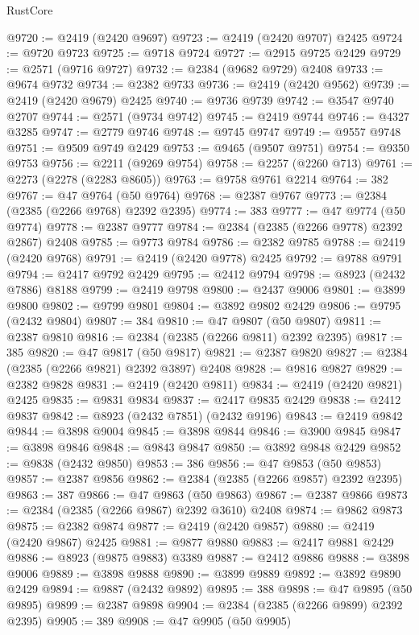 \begin{lexlean}{RustCore}
\begin{coremodule}
@9720 := @2419 (@2420 @9697)
@9723 := @2419 (@2420 @9707) @2425
@9724 := @9720 @9723
@9725 := @9718 @9724
@9727 := @2915 @9725 @2429
@9729 := @2571 (@9716 @9727)
@9732 := @2384 (@9682 @9729) @2408
@9733 := @9674 @9732
@9734 := @2382 @9733
@9736 := @2419 (@2420 @9562)
@9739 := @2419 (@2420 @9679) @2425
@9740 := @9736 @9739
@9742 := @3547 @9740 @2707
@9744 := @2571 (@9734 @9742)
@9745 := @2419 @9744
@9746 := @4327 @3285
@9747 := @2779 @9746
@9748 := @9745 @9747
@9749 := @9557 @9748
@9751 := @9509 @9749 @2429
@9753 := @9465 (@9507 @9751)
@9754 := @9350 @9753
@9756 := @2211 (@9269 @9754)
@9758 := @2257 (@2260 @713)
@9761 := @2273 (@2278 (@2283 @8605))
@9763 := @9758 @9761 @2214
@9764 := 382
@9767 := @47 @9764 (@50 @9764)
@9768 := @2387 @9767
@9773 := @2384 (@2385 (@2266 @9768) @2392 @2395)
@9774 := 383
@9777 := @47 @9774 (@50 @9774)
@9778 := @2387 @9777
@9784 := @2384 (@2385 (@2266 @9778) @2392 @2867) @2408
@9785 := @9773 @9784
@9786 := @2382 @9785
@9788 := @2419 (@2420 @9768)
@9791 := @2419 (@2420 @9778) @2425
@9792 := @9788 @9791
@9794 := @2417 @9792 @2429
@9795 := @2412 @9794
@9798 := @8923 (@2432 @7886) @8188
@9799 := @2419 @9798
@9800 := @2437 @9006
@9801 := @3899 @9800
@9802 := @9799 @9801
@9804 := @3892 @9802 @2429
@9806 := @9795 (@2432 @9804)
@9807 := 384
@9810 := @47 @9807 (@50 @9807)
@9811 := @2387 @9810
@9816 := @2384 (@2385 (@2266 @9811) @2392 @2395)
@9817 := 385
@9820 := @47 @9817 (@50 @9817)
@9821 := @2387 @9820
@9827 := @2384 (@2385 (@2266 @9821) @2392 @3897) @2408
@9828 := @9816 @9827
@9829 := @2382 @9828
@9831 := @2419 (@2420 @9811)
@9834 := @2419 (@2420 @9821) @2425
@9835 := @9831 @9834
@9837 := @2417 @9835 @2429
@9838 := @2412 @9837
@9842 := @8923 (@2432 @7851) (@2432 @9196)
@9843 := @2419 @9842
@9844 := @3898 @9004
@9845 := @3898 @9844
@9846 := @3900 @9845
@9847 := @3898 @9846
@9848 := @9843 @9847
@9850 := @3892 @9848 @2429
@9852 := @9838 (@2432 @9850)
@9853 := 386
@9856 := @47 @9853 (@50 @9853)
@9857 := @2387 @9856
@9862 := @2384 (@2385 (@2266 @9857) @2392 @2395)
@9863 := 387
@9866 := @47 @9863 (@50 @9863)
@9867 := @2387 @9866
@9873 := @2384 (@2385 (@2266 @9867) @2392 @3610) @2408
@9874 := @9862 @9873
@9875 := @2382 @9874
@9877 := @2419 (@2420 @9857)
@9880 := @2419 (@2420 @9867) @2425
@9881 := @9877 @9880
@9883 := @2417 @9881 @2429
@9886 := @8923 (@9875 @9883) @3389
@9887 := @2412 @9886
@9888 := @3898 @9006
@9889 := @3898 @9888
@9890 := @3899 @9889
@9892 := @3892 @9890 @2429
@9894 := @9887 (@2432 @9892)
@9895 := 388
@9898 := @47 @9895 (@50 @9895)
@9899 := @2387 @9898
@9904 := @2384 (@2385 (@2266 @9899) @2392 @2395)
@9905 := 389
@9908 := @47 @9905 (@50 @9905)

\end{coremodule}
\end{lexlean}
